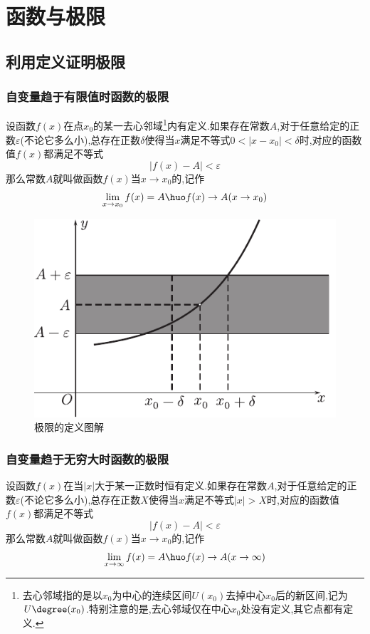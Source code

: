 \chapter{函数与极限}
\section{利用定义证明极限}
\subsection{自变量趋于有限值时函数的极限}
\thispagestyle{empty}
\tdefination[函数极限1]
设函数$f(x)$在点$x_0$的某一去心邻域\footnote{去心邻域指的是以$x_0$为中心的连续区间$U(x_0)$去掉中心$x_0$后的新区间,记为$U\degree (x_0 )$.特别注意的是,去心邻域仅在中心$x_0$处没有定义,其它点都有定义.}内有定义.如果存在常数$A$,对于任意给定的正数$\varepsilon$(不论它多么小),总存在正数$\delta$使得当$x$满足不等式$0<|x-x_0 |<\delta$时,对应的函数值$f(x)$都满足不等式
\begin{equation}
	|f(x)-A|<\varepsilon
\end{equation}
那么常数$A$就叫做函数$f(x)$当$x \to x_0$的,记作
\begin{equation}
	\lim\limits_{x\to x_0}f(x)=A \huo f(x)\to A(x \to x_0)
\end{equation}
\begin{figure}[!htb]
	\begin{center}
		\includegraphics[scale=0.8]{pictures/C-1/极限1.pdf}
	\end{center}
	\sj \sj 
	\caption{极限的定义图解}
\end{figure}
\sj
\subsection{自变量趋于无穷大时函数的极限}
\tdefination[函数极限2]
设函数$f(x)$在当$|x|$大于某一正数时恒有定义.如果存在常数$A$,对于任意给定的正数$\varepsilon$(不论它多么小),总存在正数$X$使得当$x$满足不等式$|x|>X$时,对应的函数值$f(x)$都满足不等式
\begin{equation}
	|f(x)-A|<\varepsilon
\end{equation}
那么常数$A$就叫做函数$f(x)$当$x \to x_0$的,记作
\begin{equation}
	\lim\limits_{x\to \infty}f(x)=A \huo f(x)\to A(x \to \infty )
\end{equation}

